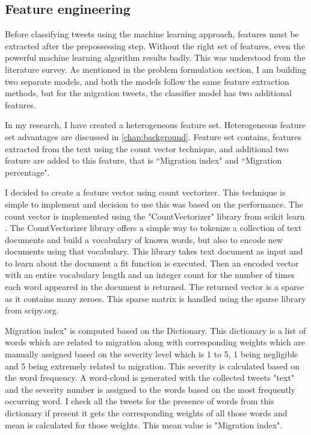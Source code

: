 \subsection{Feature engineering} \label{featureengineering}


 
Before classifying tweets using the machine learning approach, features must be extracted after the prepossessing step. Without the right set of features, even the powerful machine learning algorithm results badly. This was understood from the literature survey. As mentioned in the problem formulation section, I am building two separate models, and both the models follow the same feature extraction methods, but for the migration tweets, the classifier model has two additional features.

In my research, I have created a heterogeneous feature set. Heterogeneous feature set advantages are discussed in \ref{chap:background}. Feature set contains, features extracted from the text using the count vector technique, and additional two feature are added to this feature, that is ``Migration index" and ``Migration percentage".   

I decided to create a feature vector using count vectorizer. This technique is simple to implement and decision to use this was based on the performance. The count vector is implemented using the "CountVectorizer" library from scikit learn \cite{scikit-learn}. The CountVectorizer library offers a simple way to tokenize a collection of text documents and build a vocabulary of known words, but also to encode new documents using that vocabulary. This library takes text document as input and to learn about the document a fit function is executed. Then an encoded vector with an entire vocabulary length and an integer count for the number of times each word appeared in the document is returned. The returned vector is a sparse as it contains many zeroes. This sparse matrix is handled using the sparse library from scipy.org.

Migration index" is computed based on the Dictionary. This dictionary is a list of words which are related to migration along with corresponding weights which are manually assigned based on the severity level which is 1 to 5, 1 being negligible and 5 being extremely related to migration. This severity is calculated based on the word frequency. A word-cloud is generated with the collected tweets "text" and the severity number is assigned to the words based on the most frequently occurring word.
 I check all the tweets for the presence of words from this dictionary if present it gets the corresponding weights of all those words and mean is calculated for those weights. This mean value is "Migration index". 
 


